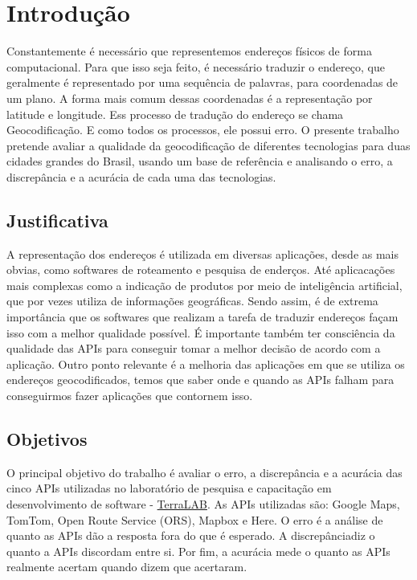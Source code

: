 \chapter{Introdução} \label{Introducao}

Constantemente é necessário que representemos endereços físicos de forma computacional. Para que isso seja feito, é necessário traduzir o endereço, que geralmente é representado por uma sequência de palavras, para coordenadas de um plano. A forma mais comum dessas coordenadas é a representação por latitude e longitude. 
Ess processo de tradução do endereço se chama Geocodificação. E como todos os processos, ele possui erro. 
O presente trabalho pretende avaliar a qualidade da geocodificação de diferentes tecnologias para duas cidades grandes do Brasil, usando um base de referência e analisando o erro, a discrepância e a acurácia de cada uma das tecnologias.

\section{Justificativa}

A representação dos endereços é utilizada em diversas aplicações, desde as mais obvias, como softwares de roteamento e pesquisa de enderços. Até aplicacações mais complexas como a indicação de produtos por meio de inteligência artificial, que por vezes utiliza de informações geográficas. 
Sendo assim, é de extrema importância que os softwares que realizam a tarefa de traduzir endereços façam isso com a melhor qualidade possível. É importante também ter consciência da qualidade das APIs para conseguir tomar a melhor decisão de acordo com a aplicação. 
Outro ponto relevante é a melhoria das aplicações em que se utiliza os endereços geocodificados, temos que saber onde e quando as APIs falham para conseguirmos fazer aplicações que contornem isso. 

\section{Objetivos}

O principal objetivo do trabalho é avaliar o erro, a discrepância e a acurácia das cinco APIs utilizadas no laboratório de pesquisa e capacitação em desenvolvimento de software - \href{https://www.exemplo.com}{TerraLAB}. As APIs utilizadas são: Google Maps, TomTom, Open Route Service (ORS), Mapbox e Here. O erro é a análise de quanto as APIs dão a resposta fora do que é esperado. A discrepânciadiz o quanto a APIs discordam entre si. Por fim, a acurácia mede o quanto as APIs realmente acertam quando dizem que acertaram. 

